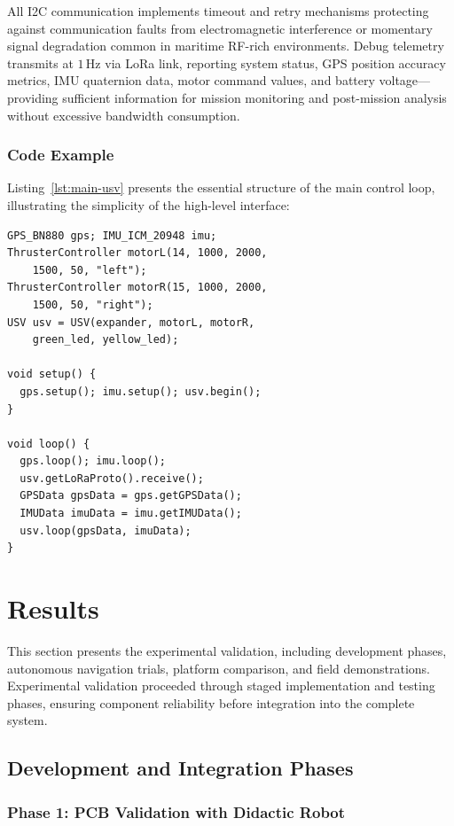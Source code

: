 \documentclass[conference]{IEEEtran}
\begin{document}
All I2C communication implements timeout and retry mechanisms protecting against communication faults from electromagnetic interference or momentary signal degradation common in maritime RF-rich environments. Debug telemetry transmits at $1 \, \mathrm{Hz}$ via LoRa link, reporting system status, GPS position accuracy metrics, IMU quaternion data, motor command values, and battery voltage—providing sufficient information for mission monitoring and post-mission analysis without excessive bandwidth consumption.

\subsubsection{Code Example}
Listing~\ref{lst:main-usv} presents the essential structure of the main control loop, illustrating the simplicity of the high-level interface:

\begin{verbatim}
GPS_BN880 gps; IMU_ICM_20948 imu;
ThrusterController motorL(14, 1000, 2000, 
    1500, 50, "left");
ThrusterController motorR(15, 1000, 2000, 
    1500, 50, "right");
USV usv = USV(expander, motorL, motorR, 
    green_led, yellow_led);

void setup() {
  gps.setup(); imu.setup(); usv.begin();
}

void loop() {
  gps.loop(); imu.loop();
  usv.getLoRaProto().receive();
  GPSData gpsData = gps.getGPSData();
  IMUData imuData = imu.getIMUData();
  usv.loop(gpsData, imuData);
}
\end{verbatim}
\label{lst:main-usv}

\section{Results}
\label{sec:results}
This section presents the experimental validation, including development phases, autonomous navigation trials, platform comparison, and field demonstrations.
Experimental validation proceeded through staged implementation and testing phases, ensuring component reliability before integration into the complete system.

\subsection{Development and Integration Phases}
\subsubsection{Phase 1: PCB Validation with Didactic Robot}
\end{document}
